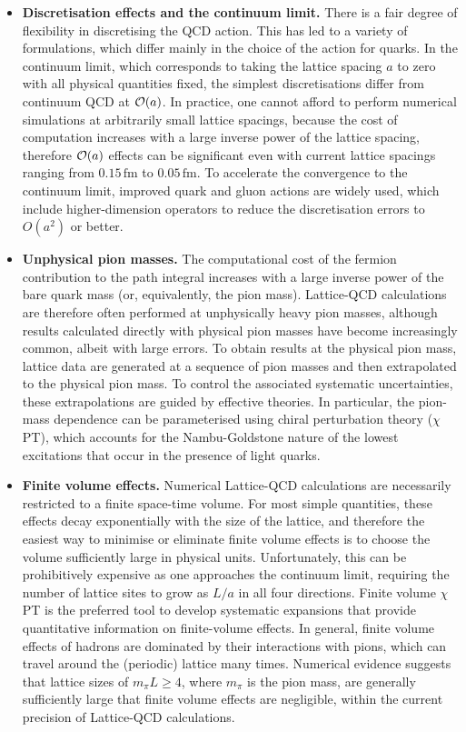 \begin{itemize}

\item {\bfseries Discretisation effects and the continuum limit.} There is 
a fair degree of flexibility in discretising the QCD action. This has
led to a variety of formulations, which differ mainly in the choice of
the action for quarks. In the continuum limit, which corresponds to taking
the lattice spacing $a$ to zero with all physical quantities fixed,
the simplest discretisations differ from continuum QCD at ${\cal
O}(a)$. In practice, one cannot afford to perform numerical
simulations at arbitrarily small lattice spacings, because the cost of
computation increases with a large inverse power of the lattice
spacing, therefore ${\cal O}(a)$ effects can be significant even
with current lattice spacings ranging from $0.15 \,\mbox{fm}$ to
$0.05 \,\mbox{fm}$. To accelerate the convergence to the continuum
limit, improved quark and gluon actions are widely used, which include
higher-dimension operators to reduce the discretisation errors to
$O(a^2)$ or better.

\item {\bfseries Unphysical pion masses.} 
The computational cost of the fermion contribution to the path
integral increases with a large inverse power of the bare quark mass
(or, equivalently, the pion mass). Lattice-QCD calculations are therefore
often performed at unphysically heavy pion masses, although results calculated
directly with physical pion masses have become increasingly common, albeit with large
errors. To obtain results at the physical pion mass, lattice data are
generated at a sequence of pion masses and then extrapolated to the
physical pion mass. To control the associated systematic
uncertainties, these extrapolations are guided by effective
theories. In particular, the pion-mass dependence can be parameterised
using chiral perturbation theory ($\chi$PT), which accounts for the
Nambu-Goldstone nature of the lowest excitations that occur in the
presence of light quarks. 

\item {\bfseries Finite volume effects.} Numerical Lattice-QCD 
calculations are necessarily restricted to a finite space-time
volume. For most simple quantities, these effects decay exponentially
with the size of the lattice, and therefore the easiest way to
minimise or eliminate finite volume effects is to choose the volume
sufficiently large in physical units. Unfortunately, this can be
prohibitively expensive as one approaches the continuum limit, requiring the
number of lattice sites to grow as $L/a$ in all four directions. Finite volume $\chi$PT is the preferred
tool to develop systematic expansions that provide quantitative
information on finite-volume effects. In general, finite volume
effects of hadrons are dominated by their interactions with pions,
which can travel around the (periodic) lattice many times. Numerical
evidence suggests that lattice sizes of $m_\pi L \geq 4$, where
$m_\pi$ is the pion mass, are generally sufficiently large that finite
volume effects are negligible, within the current precision of Lattice-QCD
calculations.


\end{itemize}
